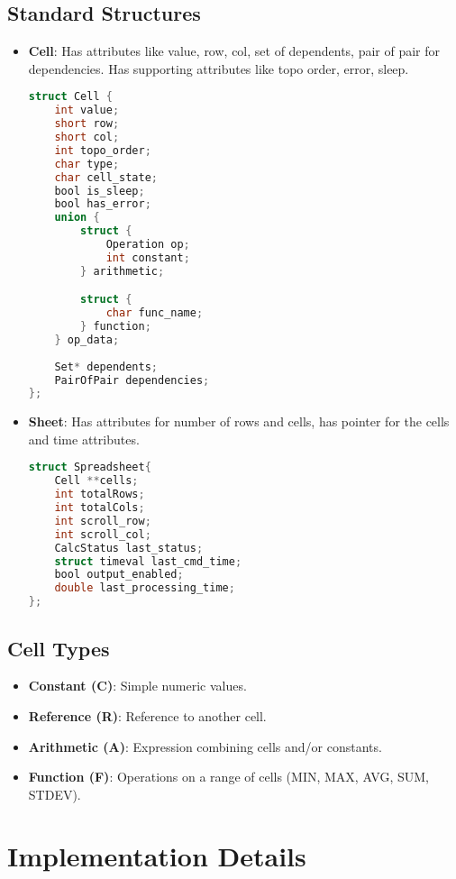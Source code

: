 \documentclass{article}
\begin{document}
\subsection{Standard Structures}
\begin{itemize}
    \item \textbf{Cell}: Has attributes like value, row, col, set of dependents, pair of pair for dependencies. Has supporting attributes like topo order, error, sleep.
    \begin{lstlisting}[language=C]
struct Cell {
    int value;          
    short row; 
    short col; 
    int topo_order;
    char type; 
    char cell_state;  
    bool is_sleep;
    bool has_error;
    union {
        struct {  
            Operation op;
            int constant;
        } arithmetic;

        struct {  
            char func_name;
        } function;
    } op_data;
    
    Set* dependents;
    PairOfPair dependencies;
};
\end{lstlisting}
    \item \textbf{Sheet}: Has attributes for number of rows and cells, has pointer for the cells and time attributes.
    \begin{lstlisting}[language=C]
struct Spreadsheet{
    Cell **cells;
    int totalRows;
    int totalCols;
    int scroll_row;
    int scroll_col;
    CalcStatus last_status;
    struct timeval last_cmd_time;
    bool output_enabled;
    double last_processing_time;
};
\end{lstlisting}
    
\end{itemize}

\subsection{Cell Types}
\begin{itemize}
    \item \textbf{Constant (C)}: Simple numeric values.
    \item \textbf{Reference (R)}: Reference to another cell.
    \item \textbf{Arithmetic (A)}: Expression combining cells and/or constants.
    \item \textbf{Function (F)}: Operations on a range of cells (MIN, MAX, AVG, SUM, STDEV).
\end{itemize}

\section{Implementation Details}
\end{document}
